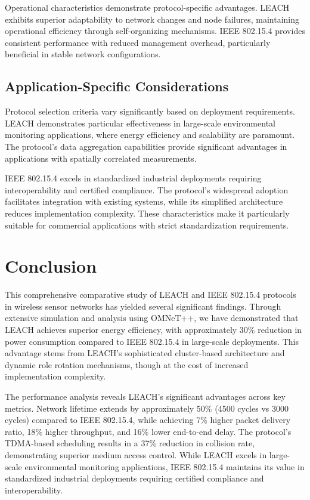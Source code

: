\documentclass[conference]{IEEEtran}
\begin{document}
Operational characteristics demonstrate protocol-specific advantages. LEACH exhibits superior adaptability to network changes and node failures, maintaining operational efficiency through self-organizing mechanisms. IEEE 802.15.4 provides consistent performance with reduced management overhead, particularly beneficial in stable network configurations.


\subsection{Application-Specific Considerations}
Protocol selection criteria vary significantly based on deployment requirements. LEACH demonstrates particular effectiveness in large-scale environmental monitoring applications, where energy efficiency and scalability are paramount. The protocol's data aggregation capabilities provide significant advantages in applications with spatially correlated measurements.

IEEE 802.15.4 excels in standardized industrial deployments requiring interoperability and certified compliance. The protocol's widespread adoption facilitates integration with existing systems, while its simplified architecture reduces implementation complexity. These characteristics make it particularly suitable for commercial applications with strict standardization requirements.

\section{Conclusion}

This comprehensive comparative study of LEACH and IEEE 802.15.4 protocols in wireless sensor networks has yielded several significant findings. Through extensive simulation and analysis using OMNeT++, we have demonstrated that LEACH achieves superior energy efficiency, with approximately 30\% reduction in power consumption compared to IEEE 802.15.4 in large-scale deployments. This advantage stems from LEACH's sophisticated cluster-based architecture and dynamic role rotation mechanisms, though at the cost of increased implementation complexity.

The performance analysis reveals LEACH's significant advantages across key metrics. Network lifetime extends by approximately 50\% (4500 cycles vs 3000 cycles) compared to IEEE 802.15.4, while achieving 7\% higher packet delivery ratio, 18\% higher throughput, and 16\% lower end-to-end delay. The protocol's TDMA-based scheduling results in a 37\% reduction in collision rate, demonstrating superior medium access control. While LEACH excels in large-scale environmental monitoring applications, IEEE 802.15.4 maintains its value in standardized industrial deployments requiring certified compliance and interoperability.
\end{document}
